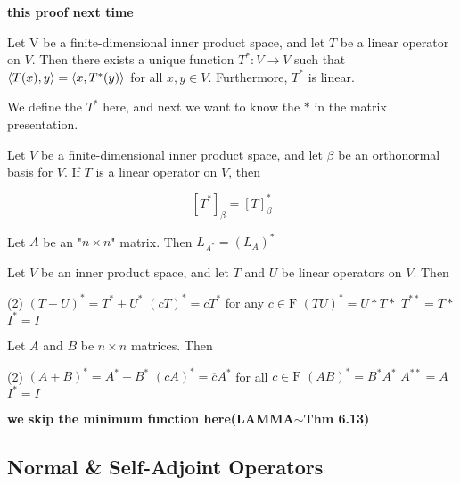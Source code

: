 \textbf{\color{red} this proof next time}

\begin{thm*}
	Let V be a finite-dimensional inner product space, and let $T$ be a linear operator on $V$. Then there exists a unique function $T^*:V\rightarrow V$ such that $\left< T(x),y \right> = \left< x,T^*(y) \right>$ for all $x,y \in V$. Furthermore, $T^*$ is linear.
\end{thm*}

\begin{tcolorbox}
	We define the $T^*$ here, and next we want to know the $*$ in the matrix presentation. 
\end{tcolorbox}

\begin{thm*}
	Let $V$ be a finite-dimensional inner product space, and let $\beta$ be an orthonormal basis for $V$. If $T$ is a linear operator on $V$, then
	
	$$[T^*]_\beta = [T]^*_\beta$$
\end{thm*}

\begin{cor*}
	Let $A$ be an "$n \times n$" matrix. Then $L_{A^*} = (L_A)^*$
\end{cor*}

\begin{thm*}
	Let $V$ be an inner product space, and let $T$ and $U$ be linear operators on $V$. Then
	
	\begin{tasks}(2)
		\task $(T+U)^* = T^* + U^*$
		\task $(cT)^* = \overline{c}T^*$ for any $c \in \mathrm F$
		\task $(TU)^* = U*T*$
		\task $T^{**} = T*$
		\task $I^* = I$
	\end{tasks}
\end{thm*}

\begin{cor*}
	Let $A$ and $B$ be $n \times n$ matrices. Then
	
	\begin{tasks}(2)
		\task $(A + B)^* = A^* + B^*$
		\task $(cA)^* = \overline{c}A^*$ for all $c \in \mathrm F$
		\task $(AB)^{*} = B^*A^*$
		\task $A^{**} = A$
		\task $I^* = I$ 
	\end{tasks}
\end{cor*}

\textbf{\color{red} we skip the minimum function here(LAMMA$\sim$Thm 6.13)}


\subsection{Normal \& Self-Adjoint Operators}


